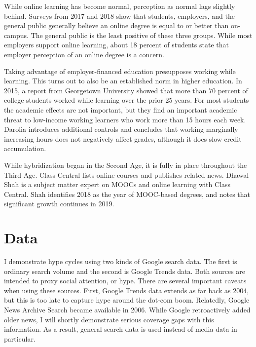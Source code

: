 \documentclass[review]{elsarticle}
\begin{document}
    While online learning has become normal, perception as normal lags slightly behind.
    Surveys from 2017 and 2018 show that students, employers, and the general public generally believe
    an online degree is equal to or better than on-campus\cite{venable_2019}.
    The general public is the least positive of these three groups.
    While most employers support online learning,
    about 18 percent of students state that employer perception of an online degree is a concern.

    Taking advantage of employer-financed education presupposes working while learning.
    This turns out to also be an established norm in higher education.
    In 2015, a report from Georgetown University showed that more than 70 percent of college students
    worked while learning over the prior 25 years\cite{carnevale2015learning}.
    For most students the academic effects are not important,
    but they find an important academic threat to low-income working learners who work more than 15 hours each week.
    Darolia\cite{darolia2014working} introduces additional controls and concludes that working
    marginally increasing hours does not negatively affect grades, although it does slow credit accumulation.

    While hybridization began in the Second Age, it is fully in place throughout the Third Age.
    Class Central lists online courses and publishes related news.
    Dhawal Shah is a subject matter expert on MOOCs and online learning with Class Central.
    Shah identifies 2018 as the year of MOOC-based degrees, and notes that significant growth continues in 2019\cite{shah_2019}.

    \section{Data}

    I demonstrate hype cycles using two kinds of Google search data.
    The first is ordinary search volume and the second is Google Trends data.
    Both sources are intended to proxy social attention, or hype.
    There are several important caveats when using these sources.
    First, Google Trends data extends as far back as 2004,
    but this is too late to capture hype around the dot-com boom.
    Relatedly, Google News Archive Search became available in 2006.
    While Google retroactively added older news, I will shortly demonstrate serious coverage gaps with this information.
    As a result, general search data is used instead of media data in particular.
\end{document}
